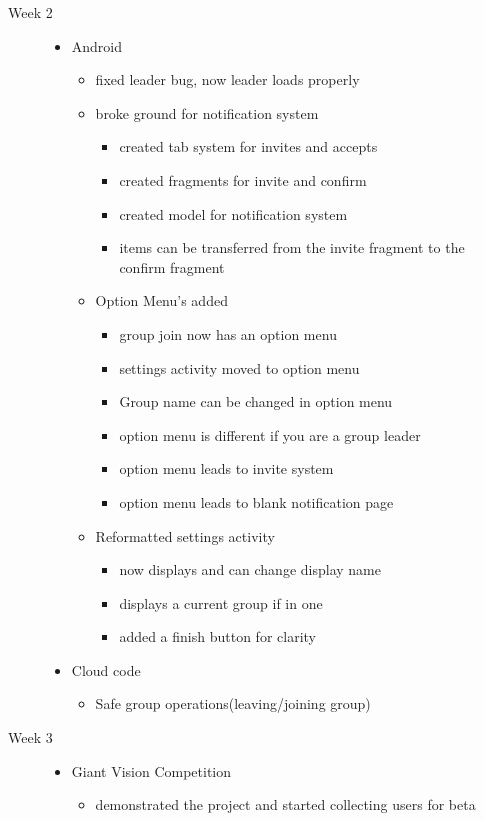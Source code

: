 \documentclass[11pt]{article}
\begin{document}
\begin{description}
  \item[Week 2] \hfill
		\begin{itemize}
		\item Android
		\begin{itemize}
			\item fixed leader bug, now leader loads properly
			\item broke ground for notification system
			\begin{itemize}
				\item created tab system for invites and accepts
				\item created fragments for invite and confirm
				\item created model for notification system
				\item items can be transferred from the invite fragment to the confirm fragment
			\end{itemize}
			\item Option Menu's added 
			\begin{itemize}
				\item group join now has an option menu
				\item settings activity moved to option menu
				\item Group name can be changed in option menu
				\item option menu is different if you are a group leader
				\item option menu leads to invite system
				\item option menu leads to blank notification page
			\end{itemize}
			\item Reformatted settings activity
			\begin{itemize}
				\item now displays and can change display name
				\item displays a current group if in one
				\item added a finish button for clarity
			\end{itemize}
		\end{itemize}
		\item Cloud code
		\begin{itemize}
			\item Safe group operations(leaving/joining group)
		\end{itemize}
	\end{itemize}
  
  \item[Week 3] \hfill
		\begin{itemize}
		\item Giant Vision Competition
		\begin{itemize}
			\item demonstrated the project and started collecting users for beta
		\end{itemize}
	\end{itemize}
\end{description}
\end{document}
